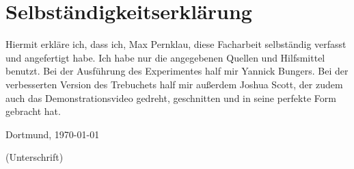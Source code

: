 \section{Selbständigkeitserklärung}

Hiermit erkläre ich, dass ich, Max Pernklau, diese Facharbeit selbständig
verfasst und angefertigt habe. Ich habe nur die angegebenen Quellen und
Hilfsmittel benutzt. Bei der Ausführung des Experimentes half mir Yannick Bungers. Bei der verbesserten Version des Trebuchets half mir außerdem Joshua Scott, der zudem auch das Demonstrationsvideo gedreht, geschnitten und in seine perfekte Form gebracht hat.

\vspace{1cm}\noindent
Dortmund, \today \quad
\begin{minipage}[t]{6cm} %
\dotfill 
\begin{center}
 \small (Unterschrift) 
\end{center}
\end{minipage}